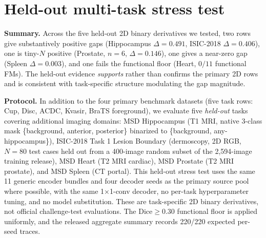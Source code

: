 \section{Held-out multi-task stress test}
\label{app:heldout}

\textbf{Summary.} Across the five held-out 2D binary derivatives we tested, two rows give substantively positive gaps (Hippocampus $\Delta{=}0.491$, ISIC-2018 $\Delta{=}0.406$), one is tiny-$N$ positive (Prostate, $n{=}6$, $\Delta{=}0.146$), one gives a near-zero gap (Spleen $\Delta{=}0.003$), and one fails the functional floor (Heart, $0/11$ functional FMs). The held-out evidence \emph{supports} rather than confirms the primary 2D rows and is consistent with task-specific structure modulating the gap magnitude.

\textbf{Protocol.} In addition to the four primary benchmark datasets (five task rows: Cup, Disc, ACDC, Kvasir, BraTS foreground), we evaluate five \emph{held-out} tasks covering additional imaging domains: MSD Hippocampus \citep{msd2022} (T1 MRI, native 3-class mask \{background, anterior, posterior\} binarized to \{background, any-hippocampus\}), ISIC-2018 Task 1 Lesion Boundary \citep{isic2018} (dermoscopy, 2D RGB, $N{=}80$ test cases held out from a 400-image random subset of the 2{,}594-image training release), MSD Heart (T2 MRI cardiac), MSD Prostate (T2 MRI prostate), and MSD Spleen (CT portal). This held-out stress test uses the same 11 generic encoder bundles and four decoder seeds as the primary source pool where possible, with the same 1$\times$1-conv decoder, no per-task hyperparameter tuning, and no model substitution. These are task-specific 2D binary derivatives, not official challenge-test evaluations. The Dice${\geq}0.30$ functional floor is applied uniformly, and the released aggregate summary records 220/220 expected per-seed traces.


